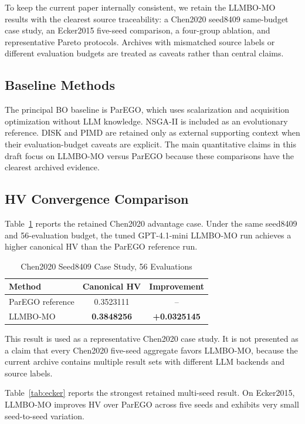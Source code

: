 \documentclass[journal]{IEEEtran}
\begin{document}
To keep the current paper internally consistent, we retain the LLMBO-MO results
with the clearest source traceability: a Chen2020 seed8409 same-budget case
study, an Ecker2015 five-seed comparison, a four-group ablation, and
representative Pareto protocols. Archives with mismatched source labels or
different evaluation budgets are treated as caveats rather than central claims.

\subsection{Baseline Methods}

The principal BO baseline is ParEGO, which uses scalarization and acquisition
optimization without LLM knowledge. NSGA-II is included as an evolutionary
reference. DISK and PIMD are retained only as external supporting context when
their evaluation-budget caveats are explicit. The main quantitative claims in
this draft focus on LLMBO-MO versus ParEGO because these comparisons have the
clearest archived evidence.

\subsection{HV Convergence Comparison}

Table~\ref{tab:chen_case} reports the retained Chen2020 advantage case. Under
the same seed8409 and 56-evaluation budget, the tuned GPT-4.1-mini LLMBO-MO run
achieves a higher canonical HV than the ParEGO reference run.

\begin{table}[htbp]
\caption{Chen2020 Seed8409 Case Study, 56 Evaluations}
\label{tab:chen_case}
\centering
\begin{tabular}{lcc}
\toprule
Method & Canonical HV & Improvement \\
\midrule
ParEGO reference & 0.3523111 & -- \\
LLMBO-MO & \textbf{0.3848256} & \textbf{+0.0325145} \\
\bottomrule
\end{tabular}
\end{table}

This result is used as a representative Chen2020 case study. It is not
presented as a claim that every Chen2020 five-seed aggregate favors LLMBO-MO,
because the current archive contains multiple result sets with different LLM
backends and source labels.

Table~\ref{tab:ecker} reports the strongest retained multi-seed result. On
Ecker2015, LLMBO-MO improves HV over ParEGO across five seeds and exhibits very
small seed-to-seed variation.
\end{document}
